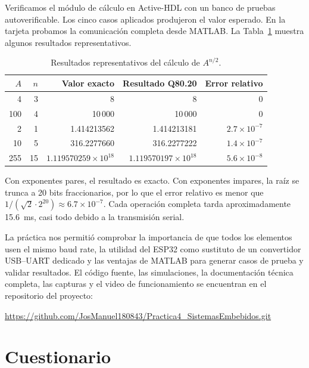 \documentclass[11pt,letterpaper]{article}
\newcommand{\repourl}{https://github.com/JosManuel180843/Practica4_SistemasEmbebidos.git}
\begin{document}
Verificamos el módulo de cálculo en Active-HDL con un banco de pruebas
autoverificable. Los cinco casos aplicados produjeron el valor esperado. En
la tarjeta probamos la comunicación completa desde MATLAB. La
Tabla~\ref{tab:resultados} muestra algunos resultados representativos.

\begin{table}[H]
\centering
\caption{Resultados representativos del cálculo de $A^{n/2}$.}
\label{tab:resultados}
\small
\begin{tabular}{@{}rrrrr@{}}
\toprule
$A$ & $n$ & \textbf{Valor exacto} & \textbf{Resultado Q80.20} & \textbf{Error relativo} \\
\midrule
4   & 3  & 8           & 8           & 0 \\
100 & 4  & 10\,000     & 10\,000     & 0 \\
2   & 1  & 1.414213562 & 1.414213181 & $2.7\times10^{-7}$ \\
10  & 5  & 316.2277660 & 316.2277222 & $1.4\times10^{-7}$ \\
255 & 15 & $1.119570259\times10^{18}$ & $1.119570197\times10^{18}$ & $5.6\times10^{-8}$ \\
\bottomrule
\end{tabular}
\end{table}

Con exponentes pares, el resultado es exacto. Con exponentes impares, la
raíz se trunca a 20 bits fraccionarios, por lo que el error relativo es
menor que $1/(\sqrt{2}\cdot2^{20}) \approx 6.7\times10^{-7}$. Cada operación
completa tarda aproximadamente 15.6~ms, casi todo debido a la transmisión
serial.

La práctica nos permitió comprobar la importancia de que todos los
elementos usen el mismo baud rate, la utilidad del ESP32 como sustituto de
un convertidor USB--UART dedicado y las ventajas de MATLAB para generar
casos de prueba y validar resultados. El código fuente, las simulaciones, la
documentación técnica completa, las capturas y el video de funcionamiento se
encuentran en el repositorio del proyecto:

\begin{center}
\url{\repourl}
\end{center}

\section{Cuestionario}
\end{document}
